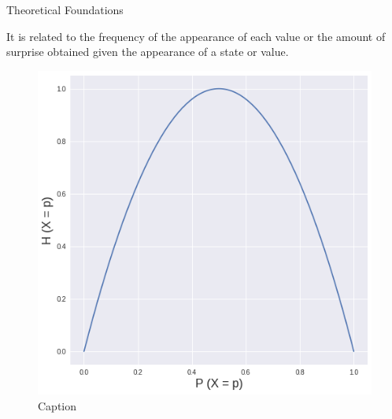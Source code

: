 \begin{frame}{{Theoretical Foundations}}

It is related to the frequency of the appearance of each value or the amount of surprise obtained given the appearance of a state or value.

\begin{figure}
    \centering
    \includegraphics[scale=0.3]{figuras/entropy.png}
    \caption{Caption}
    \label{fig:my_label}
\end{figure}
\end{frame}

